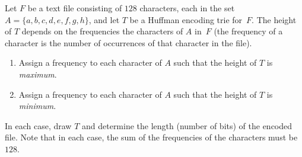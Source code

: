 Let $F$ be a text file consisting of $128$ characters, each in the set
$A=\{ a, b, c, d, e, f, g, h \}$, and let $T$ be a Huffman encoding
trie for~$F$.  The height of $T$ depends on the frequencies the
characters of $A$ in~$F$ (the frequency of a character is the number
of occurrences of that character in the file).
\begin{enumerate}
\item  Assign a frequency to each character of $A$ such that the height
  of $T$ is {\em maximum}.
\item  Assign a frequency to each character of $A$ such that the height
  of $T$ is {\em minimum}.
\end{enumerate}
In each case, draw $T$ and determine the length (number of bits) of
the encoded file.  Note that in each case, the sum of the frequencies
of the characters must be~$128$.
